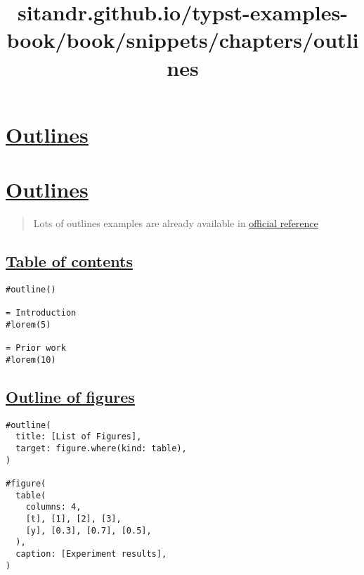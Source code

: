 \title{sitandr.github.io/typst-examples-book/book/snippets/chapters/outlines}

\section{\texorpdfstring{\hyperref[outlines]{Outlines}}{Outlines}}\label{outlines}

\section{\texorpdfstring{\hyperref[outlines-1]{Outlines}}{Outlines}}\label{outlines-1}

\begin{quote}
Lots of outlines examples are already available in
\href{https://typst.app/docs/reference/meta/outline/}{official
reference}
\end{quote}

\subsection{\texorpdfstring{\hyperref[table-of-contents]{Table of
contents}}{Table of contents}}\label{table-of-contents}

\begin{verbatim}
#outline()

= Introduction
#lorem(5)

= Prior work
#lorem(10)
\end{verbatim}

\pandocbounded{}

\subsection{\texorpdfstring{\hyperref[outline-of-figures]{Outline of
figures}}{Outline of figures}}\label{outline-of-figures}

\begin{verbatim}
#outline(
  title: [List of Figures],
  target: figure.where(kind: table),
)

#figure(
  table(
    columns: 4,
    [t], [1], [2], [3],
    [y], [0.3], [0.7], [0.5],
  ),
  caption: [Experiment results],
)
\end{verbatim}

\pandocbounded{}

